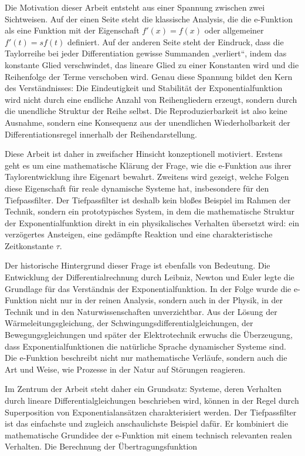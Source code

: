 \documentclass[a4paper, 12pt, twoside, openright]{report}
\theoremstyle{definition}
\theoremstyle{definition}
\begin{document}
Die Motivation dieser Arbeit entsteht aus einer Spannung zwischen zwei Sichtweisen. Auf der einen Seite steht die klassische Analysis, die die e-Funktion als eine Funktion mit der Eigenschaft $f'(x)=f(x)$ oder allgemeiner $f'(t)=s f(t)$ definiert. Auf der anderen Seite steht der Eindruck, dass die Taylorreihe bei jeder Differentiation gewisse Summanden „verliert“, indem das konstante Glied verschwindet, das lineare Glied zu einer Konstanten wird und die Reihenfolge der Terme verschoben wird. Genau diese Spannung bildet den Kern des Verständnisses: Die Eindeutigkeit und Stabilität der Exponentialfunktion wird nicht durch eine endliche Anzahl von Reihengliedern erzeugt, sondern durch die unendliche Struktur der Reihe selbst. Die Reproduzierbarkeit ist also keine Ausnahme, sondern eine Konsequenz aus der unendlichen Wiederholbarkeit der Differentiationsregel innerhalb der Reihendarstellung.

Diese Arbeit ist daher in zweifacher Hinsicht konzeptionell motiviert. Erstens geht es um eine mathematische Klärung der Frage, wie die e-Funktion aus ihrer Taylorentwicklung ihre Eigenart bewahrt. Zweitens wird gezeigt, welche Folgen diese Eigenschaft für reale dynamische Systeme hat, insbesondere für den Tiefpassfilter. Der Tiefpassfilter ist deshalb kein bloßes Beispiel im Rahmen der Technik, sondern ein prototypisches System, in dem die mathematische Struktur der Exponentialfunktion direkt in ein physikalisches Verhalten übersetzt wird: ein verzögertes Ansteigen, eine gedämpfte Reaktion und eine charakteristische Zeitkonstante $\tau$.

Der historische Hintergrund dieser Frage ist ebenfalls von Bedeutung. Die Entwicklung der Differentialrechnung durch Leibniz, Newton und Euler legte die Grundlage für das Verständnis der Exponentialfunktion. In der Folge wurde die e-Funktion nicht nur in der reinen Analysis, sondern auch in der Physik, in der Technik und in den Naturwissenschaften unverzichtbar. Aus der Lösung der Wärmeleitungsgleichung, der Schwingungsdifferentialgleichungen, der Bewegungsgleichungen und später der Elektrotechnik erwuchs die Überzeugung, dass Exponentialfunktionen die natürliche Sprache dynamischer Systeme sind. Die e-Funktion beschreibt nicht nur mathematische Verläufe, sondern auch die Art und Weise, wie Prozesse in der Natur auf Störungen reagieren.

Im Zentrum der Arbeit steht daher ein Grundsatz: Systeme, deren Verhalten durch lineare Differentialgleichungen beschrieben wird, können in der Regel durch Superposition von Exponentialansätzen charakterisiert werden. Der Tiefpassfilter ist das einfachste und zugleich anschaulichste Beispiel dafür. Er kombiniert die mathematische Grundidee der e-Funktion mit einem technisch relevanten realen Verhalten. Die Berechnung der Übertragungsfunktion
\end{document}
